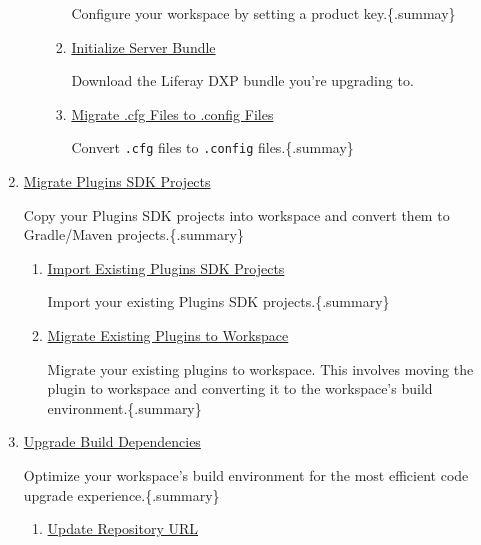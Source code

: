 \begin{enumerate}
\begin{enumerate}
\begin{enumerate}
      Configure your workspace by setting a product key.\{.summay\}
    \item
      \href{/docs/7-2/tutorials/-/knowledge_base/t/upgrading-your-development-environment\#initializing-server-bundle}{Initialize
      Server Bundle}

      Download the Liferay DXP bundle you're upgrading to.
    \item
      \href{/docs/7-2/tutorials/-/knowledge_base/t/upgrading-your-development-environment\#migrate-cfg-files-to-config-files}{Migrate
      .cfg Files to .config Files}

      Convert \texttt{.cfg} files to \texttt{.config} files.\{.summay\}
    \end{enumerate}
  \end{enumerate}
\item
  \href{/docs/7-2/tutorials/-/knowledge_base/t/migrating-plugins-sdk-projects-to-liferay-workspace}{Migrate
  Plugins SDK Projects}

  Copy your Plugins SDK projects into workspace and convert them to
  Gradle/Maven projects.\{.summary\}

  \begin{enumerate}
  \def\labelenumii{\arabic{enumii}.}
  \item
    \href{/docs/7-2/tutorials/-/knowledge_base/t/migrating-plugins-sdk-projects-to-liferay-workspace\#importing-existing-plugins-sdk-projects}{Import
    Existing Plugins SDK Projects}

    Import your existing Plugins SDK projects.\{.summary\}
  \item
    \href{/docs/7-2/tutorials/-/knowledge_base/t/migrating-plugins-sdk-projects-to-liferay-workspace\#migrating-existing-plugins-to-workspace}{Migrate
    Existing Plugins to Workspace}

    Migrate your existing plugins to workspace. This involves moving the
    plugin to workspace and converting it to the workspace's build
    environment.\{.summary\}
  \end{enumerate}
\item
  \href{/docs/7-2/tutorials/-/knowledge_base/t/upgrading-build-dependencies}{Upgrade
  Build Dependencies}

  Optimize your workspace's build environment for the most efficient
  code upgrade experience.\{.summary\}

  \begin{enumerate}
  \def\labelenumii{\arabic{enumii}.}
  \item
    \href{/docs/7-2/tutorials/-/knowledge_base/t/upgrading-build-dependencies\#updating-the-repository-url}{Update
    Repository URL}


\end{enumerate}
\end{enumerate}
